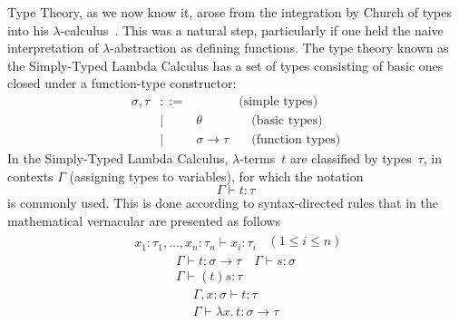 \documentclass[11pt,twocolumn]{article}
\newcommand{\lcalculus}{\mbox{$\lambda$-calculus}}
\begin{document}
Type Theory, as we now know it, arose from the integration by Church
of types into his \lcalculus~\cite{Church1940}.  This was a natural step,
particularly if one held the naive interpretation of \mbox{$\lambda$-abstraction} as
defining functions.  The type theory known as the Simply-Typed Lambda
Calculus has a set of types consisting of basic ones closed under a
function-type constructor:
  \[\begin{array}{rcll}
    \sigma,\tau & ::= & & \mbox{(simple types)}\\
    & \mid & \theta & \quad\mbox{(basic types)}\\
    & \mid & \sigma\to\tau & \quad\mbox{(function types)}
  \end{array}\]
In the Simply-Typed Lambda
Calculus, \mbox{$\lambda$-terms}~$t$ are classified by types~$\tau$, in
contexts $\Gamma$ (assigning types to variables), for which the notation
  \[
  \Gamma\vdash t:\tau
\]
is commonly used.  This is done according to syntax-directed rules that in the
mathematical vernacular are presented as follows\\[-2mm]
  \[\begin{array}{c}
    \\ \hline
    x_1:\tau_1,\ldots,x_n:\tau_n\vdash x_i:\tau_i
  \end{array}
  \enspace(1\leq i\leq n)
  \]
  \[\begin{array}{c}
    \Gamma\vdash t:\sigma\to\tau
    \quad 
    \Gamma\vdash s:\sigma
    \\ \hline
    \Gamma\vdash (t)s:\tau
  \end{array}\]
  \begin{equation}\label{LambdaAbstraction} 
  \begin{array}{c}
    \Gamma,x:\sigma\vdash t:\tau
    \\ \hline
    \Gamma\vdash\lambda x.\,t:\sigma\to\tau
  \end{array}
\end{equation}
\end{document}
